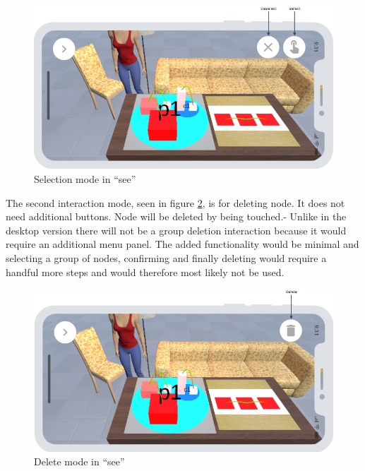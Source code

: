 \begin{figure}[htb]
    \centering
    \includegraphics[width=1\textwidth]{Concept/img/menu1.png}
    \caption{Selection mode in \enquote{\gls{see}}}\label{fig:select}
\end{figure}

The second interaction mode, seen in figure \ref{fig:delete}, is for deleting node.
It does not need additional buttons.
Node will be deleted by being touched.-
Unlike in the desktop version there will not be a group deletion interaction because it would require an additional menu panel.
The added functionality would be minimal and selecting a group of nodes, confirming and finally deleting would require a handful more steps and would therefore most likely not be used.

\begin{figure}[htb]
    \centering
    \includegraphics[width=1\textwidth]{Concept/img/menu2.png}
    \caption{Delete mode in \enquote{\gls{see}}}\label{fig:delete}
\end{figure}

